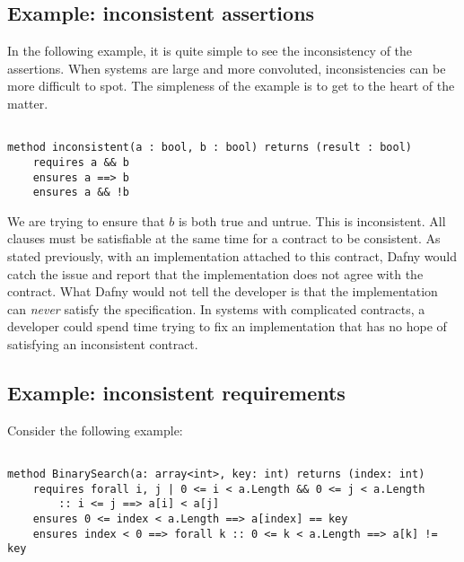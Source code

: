 \documentclass{article}
\newif\ifcomments
\newcommand{\egm}[1]{\ifcomments\textcolor{orange}{egm: #1}\fi}
\begin{document}
\subsection*{Example: inconsistent assertions}

In the following example, it is quite simple to see the inconsistency of the assertions. When systems are large and more
convoluted, inconsistencies can be more difficult to spot. The simpleness of the example is to get to the heart of the matter.

\begin{lstlisting}

method inconsistent(a : bool, b : bool) returns (result : bool)
    requires a && b
    ensures a ==> b
    ensures a && !b

\end{lstlisting}

We are trying to ensure that \(b\) is both true and untrue. This is inconsistent. All clauses must be satisfiable
at the same time for a contract to be consistent. As stated previously, with an implementation attached to this contract,
Dafny would catch the issue and report that the implementation does not agree with the contract. What Dafny would not
tell the developer is that the implementation can {\it never} satisfy the specification. In systems with complicated
contracts, a developer could spend time trying to fix an implementation that has no hope of satisfying an inconsistent
contract.
\egm{The premise is that this analysis is agnostic to the implementation, so when discussing examples, it might be wise to differentiate between implementing the contract and using the contract in a calling context. For example, if I use a method with a contract with a contradiction, either the pre-condition is always violated or Dafny can prove anything about the post-state. That is the observed consequence of contradictions. Maybe make that more clear in the example and text? Also, maybe move the example the beginning of the subsection?}

\subsection*{Example: inconsistent requirements}

Consider the following example:

\begin{lstlisting}

method BinarySearch(a: array<int>, key: int) returns (index: int)
    requires forall i, j | 0 <= i < a.Length && 0 <= j < a.Length
        :: i <= j ==> a[i] < a[j]
    ensures 0 <= index < a.Length ==> a[index] == key
    ensures index < 0 ==> forall k :: 0 <= k < a.Length ==> a[k] != key

\end{lstlisting}
\end{document}
